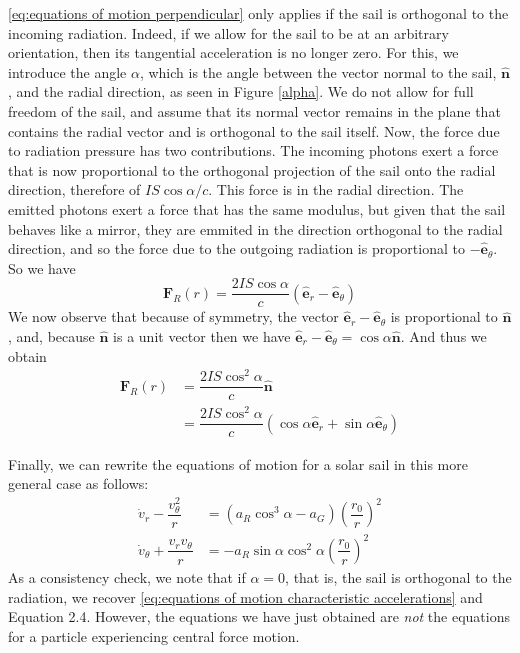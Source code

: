 \documentclass[twocolumn,12pt,a4paper]{article}
\numberwithin{equation}{section}
\begin{document}
\autoref{eq:equations of motion perpendicular} only applies if the sail is orthogonal to the incoming radiation. Indeed, if we allow for the sail to be at an arbitrary orientation, then its tangential acceleration is no longer zero. For this, we introduce the angle \( \alpha \), which is the angle between the vector normal to the sail, \( \hat{\mathbf{n}} \), and the radial direction, as seen in Figure \ref{alpha}. We do not allow for full freedom of the sail, and assume that its normal vector remains in the plane that contains the radial vector and is orthogonal to the sail itself. Now, the force due to radiation pressure has two contributions. The incoming photons exert a force that is now proportional to the orthogonal projection of the sail onto the radial direction, therefore of \( IS\cos{\alpha}/c \). This force is in the radial direction. The emitted photons exert a force that has the same modulus, but given that the sail behaves like a mirror, they are emmited in the direction orthogonal to the radial direction, and so the force due to the outgoing radiation is proportional to \( {-\hat{\mathbf{e}}_{\theta}} \). So we have
\begin{equation}
  \mathbf{F}_R(r) = \dfrac{2IS \cos{\alpha}}{c} ( \hat{\mathbf{e}}_{r} - \hat{\mathbf{e}}_{\theta})
\end{equation}
We now observe that because of symmetry, the vector \( \hat{\mathbf{e}}_{r} - \hat{\mathbf{e}}_{\theta}  \) is proportional to \( \hat{\mathbf{n}} \), and, because \( \hat{\mathbf{n}} \) is a unit vector then we have \( \hat{\mathbf{e}}_{r} - \hat{\mathbf{e}}_{\theta} = \cos{\alpha} \hat{\mathbf{n}} \). 
And thus we obtain
\begin{align}
  \mathbf{F}_R(r) &= \dfrac{2IS \cos^2{\alpha}}{c} \hat{\mathbf{n}} \\
									&= \dfrac{2IS \cos^2{\alpha}}{c} (\cos{\alpha} \hat{\mathbf{e}}_r + \sin{\alpha} \hat{\mathbf{e}}_{\theta}) 
\end{align}

Finally, we can rewrite the equations of motion for a solar sail in this more general case as follows:
\begin{align} \label{eq:equations of motion general case}
  \dot{v}_r - \dfrac{v_{\theta}^2}{r} &= (a_R \cos^3{\alpha} - a_G) \left(\dfrac{r_0}{r}\right)^2 \\ 
  \dot{v}_{\theta} + \dfrac{v_r v_{\theta}}{r} &= -a_R	\sin{\alpha} \cos^2{\alpha} \left(\dfrac{r_0}{r}\right)^2
\end{align}
As a consistency check, we note that if \( \alpha = 0 \), that is, the sail is orthogonal to the radiation, we recover \autoref{eq:equations of motion characteristic accelerations} and Equation 2.4. However, the equations we have just obtained are \emph{not} the equations for a particle experiencing central force motion.   
\end{document}
